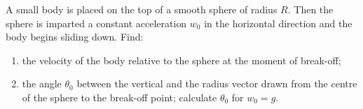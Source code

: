 \item A small body is placed on the top of a smooth sphere of radius $R$. Then the sphere is imparted a constant acceleration $w_0$ in the horizontal direction and the body begins sliding down. Find:
    \begin{enumerate}
        \item the velocity of the body relative to the sphere at the moment of break-off;
        \item the angle $\theta_0$ between the vertical and the radius vector drawn from the centre of the sphere to the break-off point; calculate $\theta_0$ for $w_0 = g$.
    \end{enumerate}